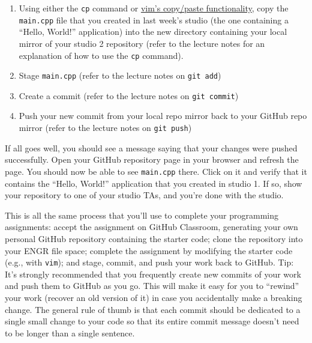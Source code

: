 \documentclass{article}
\begin{document}
\begin{enumerate}
    \item Using either the \texttt{cp} command or \href{https://linuxize.com/post/how-to-copy-cut-paste-in-vim/}{vim's copy/paste functionality}, copy the \texttt{main.cpp} file that you created in last week's studio (the one containing a ``Hello, World!'' application) into the new directory containing your local mirror of your studio 2 repository (refer to the lecture notes for an explanation of how to use the \texttt{cp} command).
    \item Stage \texttt{main.cpp} (refer to the lecture notes on \texttt{git add})
    \item Create a commit (refer to the lecture notes on \texttt{git commit})
    \item Push your new commit from your local repo mirror back to your GitHub repo mirror (refer to the lecture notes on \texttt{git push})
\end{enumerate}

If all goes well, you should see a message saying that your changes were pushed successfully. Open your GitHub repository page in your browser and refresh the page. You should now be able to see \texttt{main.cpp} there. Click on it and verify that it contains the ``Hello, World!'' application that you created in studio 1. If so, show your repository to one of your studio TAs, and you're done with the studio.

This is all the same process that you'll use to complete your programming assignments: accept the assignment on GitHub Classroom, generating your own personal GitHub repository containing the starter code; clone the repository into your ENGR file space; complete the assignment by modifying the starter code (e.g., with \texttt{vim}); and stage, commit, and push your work back to GitHub. Tip: It's strongly recommended that you frequently create new commits of your work and push them to GitHub as you go. This will make it easy for you to ``rewind'' your work (recover an old version of it) in case you accidentally make a breaking change. The general rule of thumb is that each commit should be dedicated to a single small change to your code so that its entire commit message doesn't need to be longer than a single sentence.
\end{document}
